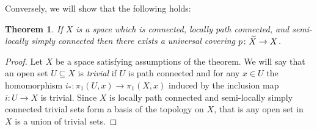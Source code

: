 \documentclass[11pt, letterpaper, oneside]{report}
\theoremstyle{pplain}
\newtheorem{theorem}{Theorem}[chapter]
\theoremstyle{ddefinition}
\theoremstyle{nnn}
\theoremstyle{eexercise}
\newcommand{\nwidetilde}{\skew{4}\widetilde}
\begin{document}
Conversely, we will show that the following holds:

\begin{theorem}
\label{UNIV COV EXISTENCE THM}
If $X$ is a space which is connected, locally path connected, and semi-locally simply connected then 
there exists a universal covering $p\colon \nwidetilde X \to X $. 
\end{theorem}

\begin{proof}
Let $X$ be a space satisfying assumptions of the theorem. We will say that an open set $U\subseteq X$ is 
\emph{trivial} if $U$ is path connected and for any $x\in U$ the homomorphism 
$i_{\ast}\colon \pi_{1}(U, x) \to \pi_{1}(X, x)$ induced by the inclusion map $i\colon U \to X$ is trivial. 
Since $X$ is locally path connected and semi-locally simply connected trivial sets form a basis of the topology 
on $X$, that is any open set in $X$ is a union of trivial sets. 


\end{proof}
\end{document}

